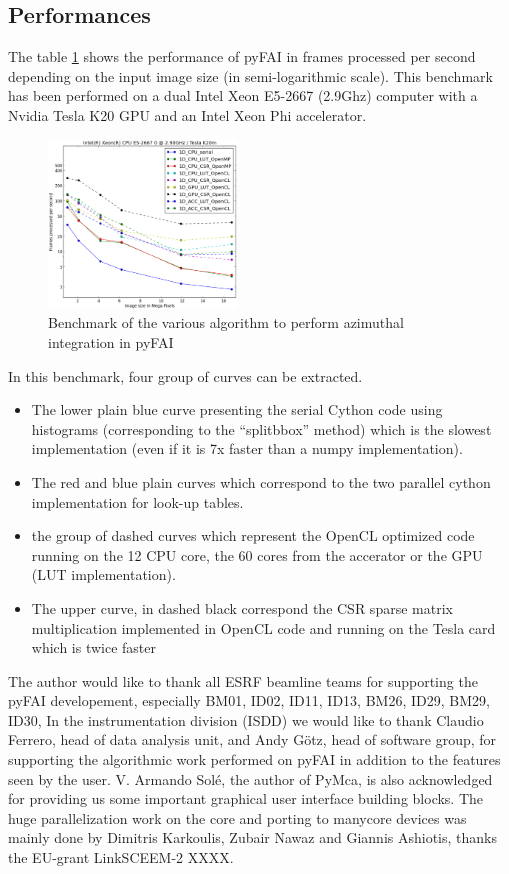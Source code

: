 \documentclass[preprint]{iucr}
\begin{document}
\subsection{Performances}
The table \ref{benchmark} shows the performance of pyFAI in frames processed per
second depending on the input image size (in semi-logarithmic scale). 
This
benchmark has been performed on a dual Intel Xeon E5-2667 (2.9Ghz) computer with a Nvidia Tesla K20 GPU and an Intel
Xeon Phi accelerator.

\begin{figure}
\label{benchmark}
\begin{center}
\includegraphics[width=5cm]{benchmark.eps}
\caption{Benchmark of the various algorithm to perform azimuthal integration in
pyFAI}
\end{center}
\end{figure}

In this benchmark, four group of curves can be extracted.
\begin{itemize}
  \item The lower plain blue curve presenting the serial Cython code using
  histograms (corresponding to the ``splitbbox'' method) which is the slowest
  implementation (even if it is 7x faster than a numpy implementation).
  \item The red and blue plain curves which correspond to the two parallel
  cython implementation for look-up tables.
  \item the group of dashed curves which represent the OpenCL optimized code
  running on the 12 CPU core, the 60 cores from the accerator or the GPU (LUT
  implementation).
  \item The upper curve, in dashed black correspond the CSR sparse matrix
  multiplication implemented in OpenCL code and running on the Tesla card which
  is twice faster
\end{itemize}  



The author would like to thank all ESRF beamline teams for supporting the pyFAI
developement, especially BM01, ID02, ID11, ID13, BM26, ID29, BM29, ID30,
In the instrumentation division (ISDD) we would like to thank Claudio Ferrero,
head of data analysis unit, and Andy G\"otz, head of software group, for
supporting the algorithmic work performed on pyFAI in addition to the features
seen by the user.
V. Armando Solé, the author of PyMca, is also acknowledged for providing us some
important graphical user interface building blocks.  
The huge parallelization work on the core and porting to manycore devices
was mainly done by Dimitris Karkoulis, Zubair Nawaz and Giannis Ashiotis,
thanks the EU-grant LinkSCEEM-2 XXXX.
\end{document}
